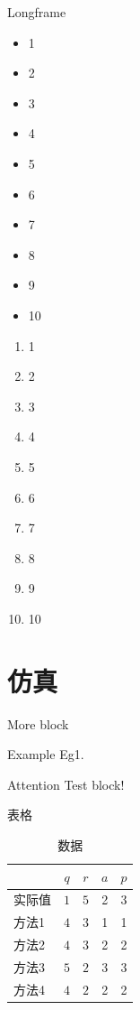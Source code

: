 \documentclass[hyperref,UTF8,11pt]{beamer}
\numberwithin{equation}{section} %
\begin{document}
\begin{frame}[allowframebreaks]{Longframe}
    \begin{itemize}
        \item 1
        \item 2
        \item 3
        \item 4
        \item 5
        \item 6
        \item 7
        \item 8
        \item 9
        \item 10
    \end{itemize}
    \begin{enumerate}
        \item 1
        \item 2
        \item 3
        \item 4
        \item 5
        \item 6
        \item 7
        \item 8
        \item 9
        \item 10
    \end{enumerate}
\end{frame}

\section{仿真}

\begin{frame}{More block}
    \begin{example}{Example}
    Eg1.
    \end{example}
    \begin{alert}{Attention}
        Test block!
    \end{alert}
\end{frame}

\begin{frame}{表格}
    \begin{table}[]
        \centering
        \caption{数据}
        \label{tab1}
        \begin{tabular}{p{3cm}cccc}
        \toprule
        & $q$    & $r$ & $a$ & $p$           \\ 
        \midrule
        实际值   & $1$  & $5$  & 2   & 3  \\
        方法1    & $4$ & $3$ & 1 & 1\\
        方法2    & $4$ & $3$ & 2 & 2\\
        方法3    & $5$ & $2$ & 3 & 3\\
        方法4    & $4$ & $2$ & 2 & 2\\ \bottomrule
        \end{tabular}
    \end{table}
\end{frame}
\end{document}
